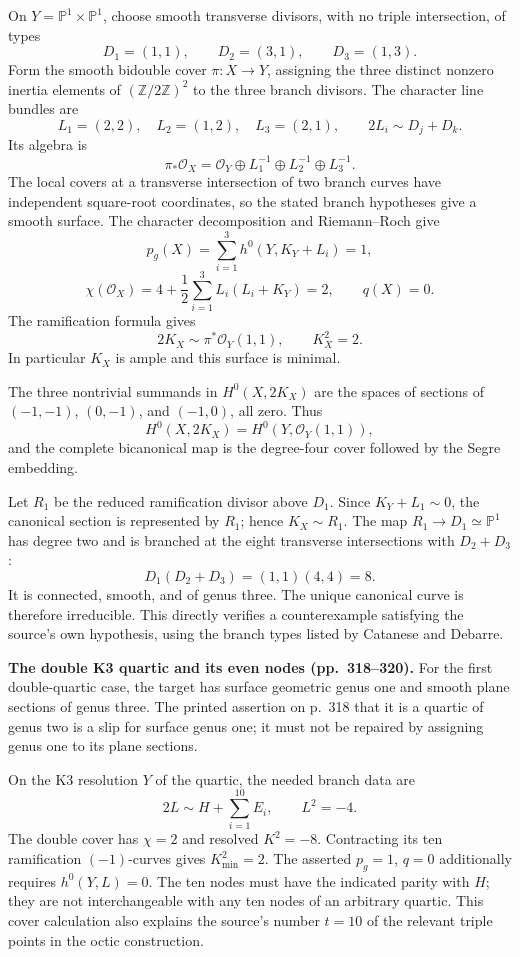 \begin{example}
\label{cp2-viii-bidouble-example}
On \(Y=\mathbb P^1\times\mathbb P^1\), choose smooth transverse divisors, with no triple intersection, of types
\[
D_1=(1,1),\qquad D_2=(3,1),\qquad D_3=(1,3).
\]
Form the smooth bidouble cover \(\pi:X\to Y\), assigning the three distinct nonzero inertia elements of \((\mathbb Z/2\mathbb Z)^2\) to the three branch divisors. The character line bundles are
\[
L_1=(2,2),\quad L_2=(1,2),\quad L_3=(2,1),
\qquad 2L_i\sim D_j+D_k.
\]
Its algebra is
\[
\pi_*\mathcal O_X=
\mathcal O_Y\oplus L_1^{-1}\oplus L_2^{-1}\oplus L_3^{-1}.
\]
The local covers at a transverse intersection of two branch curves have independent square-root coordinates, so the stated branch hypotheses give a smooth surface. The character decomposition and Riemann--Roch give
\[
p_g(X)=\sum_{i=1}^3h^0(Y,K_Y+L_i)=1,
\]
\[
\chi(\mathcal O_X)=4+\frac12\sum_{i=1}^3 L_i(L_i+K_Y)=2,
\qquad q(X)=0.
\]
The ramification formula gives
\[
2K_X\sim\pi^*\mathcal O_Y(1,1),\qquad K_X^2=2.
\]
In particular \(K_X\) is ample and this surface is minimal.

The three nontrivial summands in \(H^0(X,2K_X)\) are the spaces of sections of \((-1,-1)\), \((0,-1)\), and \((-1,0)\), all zero. Thus
\[
H^0(X,2K_X)=H^0(Y,\mathcal O_Y(1,1)),
\]
and the complete bicanonical map is the degree-four cover followed by the Segre embedding.

Let \(R_1\) be the reduced ramification divisor above \(D_1\). Since \(K_Y+L_1\sim0\), the canonical section is represented by \(R_1\); hence \(K_X\sim R_1\). The map \(R_1\to D_1\simeq\mathbb P^1\) has degree two and is branched at the eight transverse intersections with \(D_2+D_3\):
\[
D_1(D_2+D_3)=(1,1)(4,4)=8.
\]
It is connected, smooth, and of genus three. The unique canonical curve is therefore irreducible. This directly verifies a counterexample satisfying the source's own hypothesis, using the branch types listed by Catanese and Debarre.
\end{example}

\textbf{The double K3 quartic and its even nodes (pp.~318--320).}
For the first double-quartic case, the target has surface geometric genus one and smooth plane sections of genus three. The printed assertion on p.~318 that it is a quartic of genus two is a slip for surface genus one; it must not be repaired by assigning genus one to its plane sections.

On the K3 resolution \(Y\) of the quartic, the needed branch data are
\[
2L\sim H+\sum_{i=1}^{10}E_i,\qquad L^2=-4.
\]
The double cover has \(\chi=2\) and resolved \(K^2=-8\). Contracting its ten ramification \((-1)\)-curves gives \(K_{\min}^2=2\). The asserted \(p_g=1\), \(q=0\) additionally requires \(h^0(Y,L)=0\). The ten nodes must have the indicated parity with \(H\); they are not interchangeable with any ten nodes of an arbitrary quartic. This cover calculation also explains the source's number \(t=10\) of the relevant triple points in the octic construction.

